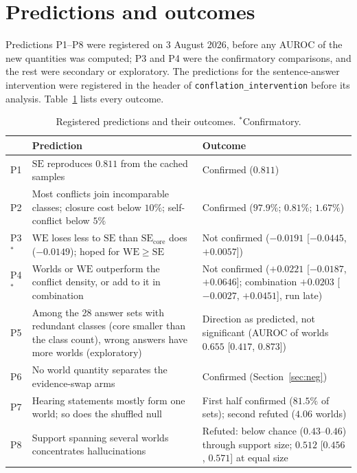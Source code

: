 \documentclass[english]{desafiokunumi}
\theoremstyle{definition}
\theoremstyle{remark}
\newcommand{\SE}{\mathrm{SE}}
\newcommand{\SEc}{\mathrm{SE}_{\mathrm{core}}}
\newcommand{\WE}{\mathrm{WE}}
\begin{document}
\section{Predictions and outcomes}
\label{sec:pred}

Predictions P1--P8 were registered on 3 August 2026, before any AUROC of the
new quantities was computed; P3 and P4
were the confirmatory comparisons, and the rest were secondary or
exploratory. The predictions for the sentence-answer intervention were
registered in the header of \texttt{conflation\_intervention} before its analysis.
Table~\ref{tab:pred} lists every outcome.

\begin{table}[ht]
  \centering
  \caption{Registered predictions and their outcomes. $^*$Confirmatory.}
  \label{tab:pred}
  \small
  \begin{tabular}{@{}l>{\raggedright\arraybackslash}p{6.2cm}>{\raggedright\arraybackslash}p{5.7cm}@{}}
    \toprule
    & \textbf{Prediction} & \textbf{Outcome} \\
    \midrule
    P1 & $\SE$ reproduces $0.811$ from the cached samples & Confirmed ($0.811$) \\
    P2 & Most conflicts join incomparable classes; closure cost below $10\%$; self-conflict below $5\%$ & Confirmed ($97.9\%$; $0.81\%$; $1.67\%$) \\
    P3$^*$ & $\WE$ loses less to $\SE$ than $\SEc$ does ($-0.0149$); hoped for $\WE \ge \SE$ & Not confirmed ($-0.0191$ [$-0.0445$, $+0.0057$]) \\
    P4$^*$ & Worlds or $\WE$ outperform the conflict density, or add to it in combination & Not confirmed ($+0.0221$ [$-0.0187$, $+0.0646$]; combination $+0.0203$ [$-0.0027$, $+0.0451$], run late) \\
    P5 & Among the 28 answer sets with redundant classes (core smaller than the class count), wrong answers have more worlds (exploratory) & Direction as predicted, not significant (AUROC of worlds $0.655$ [$0.417$, $0.873$]) \\
    P6 & No world quantity separates the evidence-swap arms & Confirmed (Section~\ref{sec:neg}) \\
    P7 & Hearing statements mostly form one world; so does the shuffled null & First half confirmed ($81.5\%$ of sets); second refuted ($4.06$ worlds) \\
    P8 & Support spanning several worlds concentrates hallucinations & Refuted: below chance ($0.43$--$0.46$) through support size; $0.512$ [$0.456$, $0.571$] at equal size \\

\end{tabular}
\end{table}
\end{document}
